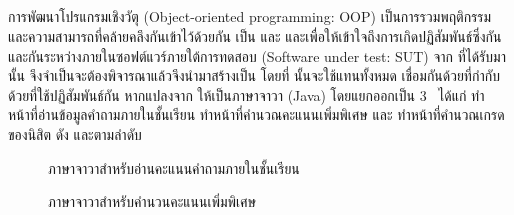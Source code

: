 {{\subsection{\FirstTimeDefine{\scg}{\scgEN}}

การพัฒนาโปรแกรมเชิงวัตุ (Object-oriented programming: OOP) เป็นการรวมพฤติกรรม และความสามารถที่คล้ายคลึงกันเข้าไว้ด้วยกัน \cite{kindler2011}
เป็น\FirstTimeDefine{\class}{\classEN} \FirstTimeDefine{\method}{\methodEN} และ \FirstTimeDefine{\attribute}{\attributeEN} 
และเพื่อให้เข้าใจถึงการเกิดปฏิสัมพันธ์ซึ่งกันและกันระหว่าง{\class}ภายในซอฟต์แวร์ภายใต้การทดสอบ (Software under test: SUT) จาก{\sourcecode} 
ที่ได้รับมานั้น จึงจำเป็นจะต้องพิจารณา{\sourcecode}แล้วจึงนำมาสร้างเป็น \FirstTimeDefine{\scg}{\scgEN} โดยที่{\scg} 
นั้นจะใช้{\Node}แทน{\class}ทั้งหมด เชื่อมกันด้วย{\Edge}ที่กำกับด้วย{\method}ที่{\class}ใช้ปฏิสัมพันธ์กัน หากแปลง{\sourcecode}จาก
 ให้เป็น{\sourcecode}ภาษาจาวา (Java) โดยแยกออกเป็น 3 \class\ ได้แก่  
ทำหน้าที่อ่านข้อมูลคำถามภายในชั้นเรียน  ทำหน้าที่คำนวณคะแนนเพิ่มพิเศษ และ  ทำหน้าที่คำนวณเกรดของนิสิต 
ดัง   และตามลำดับ

\begin{figure}[ht!]
    \lstset{basicstyle=\small,style=thesiscodestyle,language=java}
    
    \caption{{\sourcecode}ภาษาจาวาสำหรับอ่านคะแนนคำถามภายในชั้นเรียน}
    \label{fig:javaQuiz}
\end{figure}

\begin{figure}[ht!]
    \lstset{basicstyle=\small,style=thesiscodestyle,language=java}
    
    \caption{{\sourcecode}ภาษาจาวาสำหรับคำนวนคะแนนเพิ่มพิเศษ}
    \label{fig:javaBonusScore}
\end{figure}

}}

